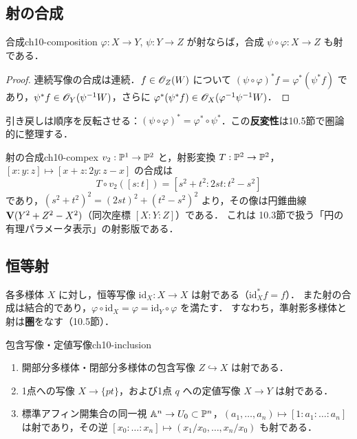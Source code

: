 \subsection{射の合成}

\begin{myprop}{合成}{ch10-composition}
$\varphi:X\to Y$, $\psi:Y\to Z$ が射ならば，合成 $\psi\circ\varphi:X\to Z$ も射である．
\end{myprop}

\begin{proof}
連続写像の合成は連続．$f\in\mathscr{O}_Z(W)$ について $(\psi\circ\varphi)^*f=\varphi^*(\psi^*f)$ であり，$\psi^*f\in\mathscr{O}_Y(\psi^{-1}W)$，さらに $\varphi^*(\psi^*f)\in\mathscr{O}_X(\varphi^{-1}\psi^{-1}W)$．
\end{proof}

引き戻しは順序を反転させる：$(\psi\circ\varphi)^*=\varphi^*\circ\psi^*$．この\textbf{反変性}は10.5節で圏論的に整理する．

\begin{myex}{射の合成}{ch10-compex}
$v_2:\mathbb{P}^1\to\mathbb{P}^2$ と，射影変換 $T:\mathbb{P}^2\to\mathbb{P}^2$，$[x:y:z]\mapsto[x+z:2y:z-x]$ の合成は
\[
  T\circ v_2([s:t])=[s^2+t^2:2st:t^2-s^2]
\]
であり，$(s^2+t^2)^2=(2st)^2+(t^2-s^2)^2$ より，その像は円錐曲線 $\mathbf{V}(Y^2+Z^2-X^2)$（同次座標 $[X:Y:Z]$）である．
これは 10.3節で扱う「円の有理パラメータ表示」の射影版である．
\end{myex}

\subsection{恒等射}

各多様体 $X$ に対し，恒等写像 $\mathrm{id}_X:X\to X$ は射である（$\mathrm{id}_X^*f=f$）．
また射の合成は結合的であり，$\varphi\circ\mathrm{id}_X=\varphi=\mathrm{id}_Y\circ\varphi$ を満たす．
すなわち，準射影多様体と射は\textbf{圏}をなす（10.5節）．

\begin{myex}{包含写像・定値写像}{ch10-inclusion}
\begin{enumerate}
  \item 開部分多様体・閉部分多様体の包含写像 $Z\hookrightarrow X$ は射である．
  \item 1点への写像 $X\to\{pt\}$，および1点 $q$ への定値写像 $X\to Y$ は射である．
  \item 標準アフィン開集合の同一視 $\mathbb{A}^n\to U_0\subset\mathbb{P}^n$，$(a_1,\dots,a_n)\mapsto[1:a_1:\dots:a_n]$ は射であり，その逆 $[x_0:\dots:x_n]\mapsto(x_1/x_0,\dots,x_n/x_0)$ も射である．
\end{enumerate}
\end{myex}

